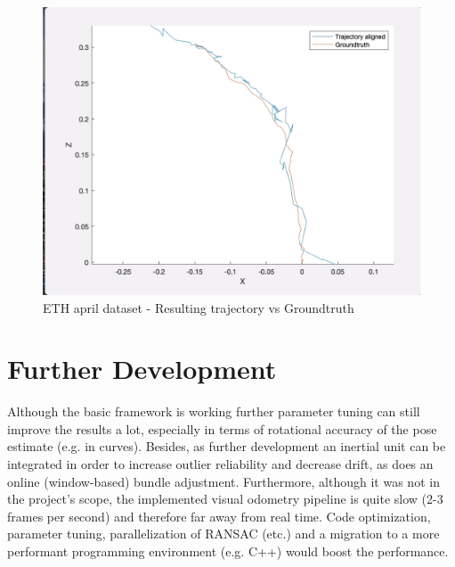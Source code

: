 \documentclass[letterpaper, 12 pt]{article}
\begin{document}
\begin{multicols*}{2}
\begin{figure}[H]
\begin{center}
\includegraphics[width=\linewidth]{eth_april.png}
\end{center}
\caption{ETH april dataset - Resulting trajectory vs Groundtruth}
\label{fig:results_eth_april}
\end{figure}

\section{Further Development}
Although the basic framework is working further parameter tuning can still improve the results a lot, especially in terms of rotational accuracy of the pose estimate (e.g. in curves). 
Besides, as further development an inertial unit can be integrated in order to increase outlier reliability and decrease drift, as does an online (window-based) bundle adjustment. Furthermore, although it was not in the project's scope, the implemented visual odometry pipeline is quite slow (2-3 frames per second) and therefore far away from real time. Code optimization, parameter tuning, parallelization of RANSAC (etc.) and a migration to a more performant programming environment  (e.g. C++) would boost the performance. 

\end{multicols*}
\end{document}
